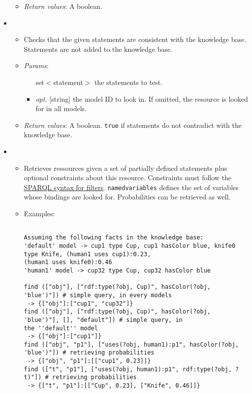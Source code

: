 \begin{itemize}
\begin{itemize}
\item  \emph{Return values}: A boolean.
\end{itemize}

\item  {}
\begin{itemize}
\item  Checks that the given statements are consistent with the knowledge base. Statements are not added to the knowledge base.
\item  \emph{Params}:
\begin{itemize}
\item  [set$<$statement$>$] the statements to test.
\item  \emph{opt.} [string] the model ID to look in. If omitted, the resource is looked for in all models. 
\end{itemize}

\item  \emph{Return values}: A boolean. \texttt{true} if statements do not contradict with the knowledge base.
\end{itemize}

\item  {}
\begin{itemize}
\item  Retrieves ressources given a set of partially defined statements plus optional constraints about this resource. Constraints must follow the \href{http://www.w3.org/TR/rdf-sparql-query/\#tests}{ SPARQL syntax for filters}. \texttt{named{\textunderscore}variables} defines the set of variables whose bindings are looked for. Probabilities can be retrieved as well.
\item  Examples: 
\small
\begin{verbatim}

Assuming the following facts in the knowledge base:
'default' model -> cup1 type Cup, cup1 hasColor blue, knife0 type Knife, (human1 uses cup1):0.23,
(human1 uses knife0):0.46
'human1' model -> cup32 type Cup, cup32 hasColor blue

find (["obj"], ["rdf:type(?obj, Cup)", hasColor(?obj, 'blue')"]) # simple query, in every models
 -> {["obj"]:["cup1", "cup32"]}
find (["obj"], ["rdf:type(?obj, Cup)", hasColor(?obj, 'blue')"], [], "default"]) # simple query, in
the ''default'' model
 -> {["obj"]:["cup1"]}
find (["obj", "p1"], ["uses(?obj, human1):p1", hasColor(?obj, 'blue')"]) # retrieving probabilities
 -> {["obj", "p1"]:[["cup1", 0.23]]}
find (["t", "p1"], ["uses(?obj, human1):p1", rdf:type(?obj, ?t)"]) # retrieving probabilities
 -> {["t", "p1"]:[["Cup", 0.23], ["Knife", 0.46]]}


\end{verbatim}
\end{itemize}
\end{itemize}
